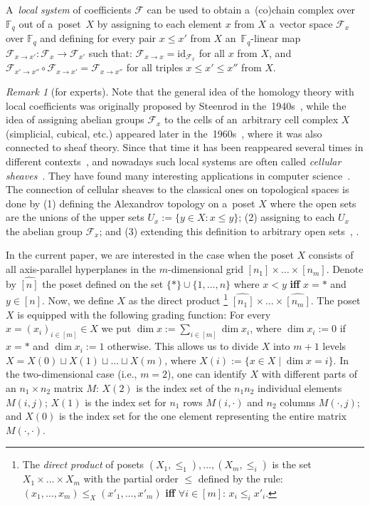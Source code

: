 \documentclass[11pt]{article}
\newcommand{\Iff}{\textbf{if\textcompwordmark f} }
\let\le\leqslant
\theoremstyle{plain}
\theoremstyle{definition}
\theoremstyle{remark}
\newtheorem{remark}{Remark}
\newcommand{\id}{\mathrm{id}}
\newcommand{\cF}{\mathcal{F}}
\newcommand{\F}{\mathbb{F}}
\begin{document}
A~\emph{local system} of coefficients $\cF$ can be used to obtain a~(co)chain complex over $\F_q$ out of a~poset~$X$ by assigning to each element $x$ from $X$ a~vector space $\cF_x$ over $\F_q$ and defining for every pair $x \le x'$ from $X$ an~$\F_q$-linear map $\cF_{x\to x'}\colon \cF_x \to \cF_{x'}$  such that:  $\cF_{x\to x} = \id_{\cF_x}$ for all $x$ from $X$, and $\cF_{x'\to x''}\circ\cF_{x\to x'} = \cF_{x\to x''}$ for all triples $x \le  x' \le x''$ from $X$.  

\begin{remark}[for experts]\label{rm:sheaves}
Note that the general idea of the homology theory with local coefficients was originally proposed by Steenrod in the~1940s~\cite{Steenrod:1943}, while the idea of assigning abelian groups $\cF_x$ to the cells of an~arbitrary cell complex $X$ (simplicial, cubical, etc.) appeared later in the~1960s~\cite[p.~624]{Zeeman:1962}, where it was also connected to sheaf theory. Since that time it has been reappeared several times in different contexts~\cite{Kashiwara:1984, shepard1985cellular}, and nowadays such local systems are often called \emph{cellular sheaves}~\cite{Curry:2014, Hansen:2019}. They have found many interesting applications in computer science~\cite[Chapter~9]{ghrist2014elementary}. The connection of cellular sheaves to the classical ones on topological spaces is done by (1) defining the Alexandrov topology on a~poset $X$ where the open sets are the unions of the upper sets $U_x := \{y\in X \colon x \le y\}$; (2) assigning to each $U_x$ the abelian group $\cF_x$; and (3) extending this definition to arbitrary open sets~\cite[Section~4.2]{Curry:2014}, \cite[Theorem~6.1]{Hu:2020}. 
\end{remark}


In the current paper, we are interested in the case when the poset $X$ consists of all  axis-parallel hyperplanes in the $m$-dimensional grid $[n_1]\times\dots\times [n_m]$. Denote by $\widehat{[n]}$ the poset defined on the set $\{*\}\cup \{1,\dots,n\}$ where $x < y$ \Iff $x=*$ and $y\in [n]$. Now, we define $X$ as the direct product%
    \footnote{The \emph{direct product} of posets $(X_1,\le_1),\dots,(X_m,\le_i)$ is the set $X_1\times\dots\times X_m$ with the partial order $\le $ defined by the rule: $(x_1,\dots,x_m) \le_{X} (x'_1,\dots,x'_m)$ \Iff  $\forall i\in[m]$: $x_i \le_{i} x'_i$.} 
$\widehat{[n_1]}\times\dots\times \widehat{[n_m]}$. The poset $X$ is equipped with the following grading function: For every $x = (x_i)_{i\in [m]}\in X$ we put  $\dim x := \sum_{i\in [m]} \dim x_i$, where $\dim x_i := 0$ if $x=*$ and $\dim x_i := 1$ otherwise. This allows us to divide $X$ into  $m+1$ levels $X = X(0)\sqcup X(1) \sqcup \dots \sqcup X(m)$, where $X(i) := \{x\in X \mid \dim x = i \}$.
In the two-dimensional case (i.e., $m=2$), one can identify $X$ with different parts of an $n_1\times n_2$ matrix $M$: $X(2)$ is the index set of the $n_1 n_2$ individual elements $M(i,j)$; $X(1)$ is the index set for  $n_1$ rows $M(i,\cdot)$ and  $n_2$ columns $M(\cdot, j)$; and $X(0)$ is the index set for the one element representing the entire matrix $M(\cdot,\cdot)$. 
\end{document}
